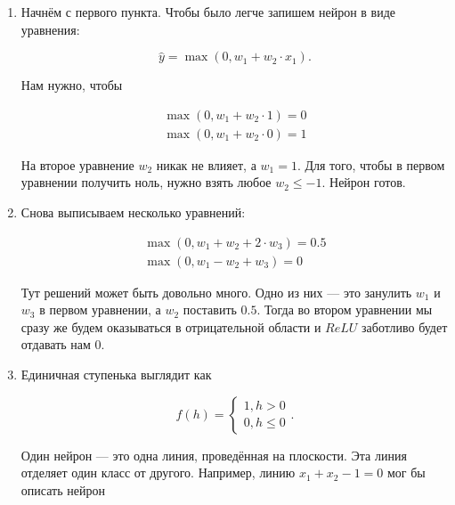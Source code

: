 \begin{sol}
\vspace{-1.2cm} 
\begin{enumerate}
\item Начнём с первого пункта. Чтобы было легче запишем нейрон в виде уравнения: 

$$
\hat y = \max(0, w_1 + w_2 \cdot x_1).
$$

Нам нужно, чтобы 

\begin{equation*}
\begin{aligned}
\max(0, w_1 + w_2 \cdot 1) = 0 \\ 
\max(0, w_1 + w_2 \cdot 0) = 1 
\end{aligned}
\end{equation*}

На второе уравнение $w_2$ никак не влияет, а $w_1 = 1.$ Для того, чтобы в первом уравнении получить ноль, нужно взять любое $w_2 \le -1$. Нейрон готов. 

\item Снова выписываем несколько уравнений: 

\begin{equation*}
\begin{aligned}
\max(0, w_1 + w_2 + 2 \cdot w_3) = 0.5 \\ 
\max(0, w_1 - w_2 + w_3) = 0 
\end{aligned}
\end{equation*}

Тут решений может быть довольно много. Одно из них --- это занулить $w_1$ и $w_3$ в первом уравнении, а $w_2$ поставить $0.5$. Тогда во втором уравнении мы сразу же будем оказываться в отрицательной области и $ReLU$ заботливо будет отдавать нам $0$. 

\item Единичная ступенька выглядит как

$$
f(h) = \begin{cases} 1, h > 0 \\ 0, h \le 0 \end{cases}.
$$

Один нейрон --- это одна линия, проведённая на плоскости. Эта линия отделяет один класс от другого. Например, линию $ x_1 + x_2 - 1 = 0 $ мог бы описать нейрон 

\begin{minipage}{0.49\linewidth}
\begin{center}
\end{center}
\end{minipage}
\end{enumerate}
\end{sol}
